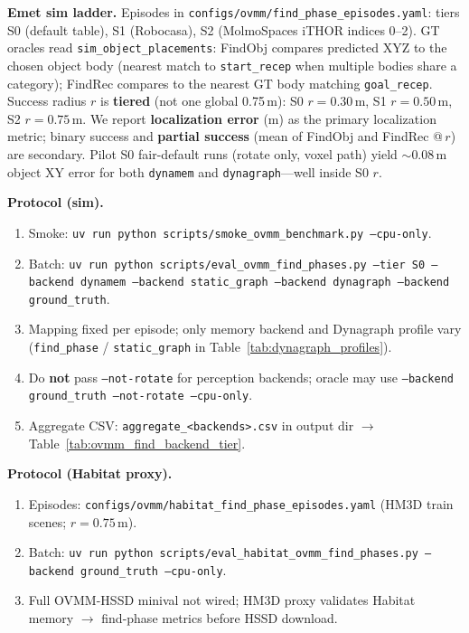 \textbf{Emet sim ladder.}
Episodes in \texttt{configs/ovmm/find\_phase\_episodes.yaml}: tiers S0 (default table), S1 (Robocasa), S2 (MolmoSpaces iTHOR indices 0--2).
GT oracles read \texttt{sim\_object\_placements}: FindObj compares predicted XYZ to the chosen object body (nearest match to \texttt{start\_recep} when multiple bodies share a category); FindRec compares to the nearest GT body matching \texttt{goal\_recep}.
Success radius $r$ is \textbf{tiered} (not one global 0.75\,m): S0 $r{=}0.30$\,m, S1 $r{=}0.50$\,m, S2 $r{=}0.75$\,m.
We report \textbf{localization error} (m) as the primary localization metric; binary success and \textbf{partial success} (mean of FindObj and FindRec @\,$r$) are secondary.
Pilot S0 fair-default runs (rotate only, voxel path) yield $\sim$0.08\,m object XY error for both \texttt{dynamem} and \texttt{dynagraph}---well inside S0 $r$.

\textbf{Protocol (sim).}
\begin{enumerate}
  \item Smoke: \texttt{uv run python scripts/smoke\_ovmm\_benchmark.py --cpu-only}.
  \item Batch: \texttt{uv run python scripts/eval\_ovmm\_find\_phases.py --tier S0 --backend dynamem --backend static\_graph --backend dynagraph --backend ground\_truth}.
  \item Mapping fixed per episode; only memory backend and Dynagraph profile vary (\texttt{find\_phase} / \texttt{static\_graph} in Table~\ref{tab:dynagraph_profiles}).
  \item Do \textbf{not} pass \texttt{--not-rotate} for perception backends; oracle may use \texttt{--backend ground\_truth --not-rotate --cpu-only}.
  \item Aggregate CSV: \texttt{aggregate\_<backends>.csv} in output dir $\rightarrow$ Table~\ref{tab:ovmm_find_backend_tier}.
\end{enumerate}

\textbf{Protocol (Habitat proxy).}
\begin{enumerate}
  \item Episodes: \texttt{configs/ovmm/habitat\_find\_phase\_episodes.yaml} (HM3D train scenes; $r{=}0.75$\,m).
  \item Batch: \texttt{uv run python scripts/eval\_habitat\_ovmm\_find\_phases.py --backend ground\_truth --cpu-only}.
  \item Full OVMM-HSSD minival not wired; HM3D proxy validates Habitat memory $\rightarrow$ find-phase metrics before HSSD download.
\end{enumerate}

